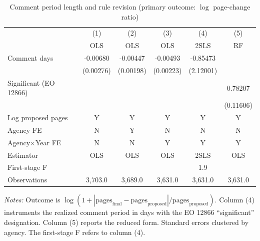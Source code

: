 \begin{table}[t]
\caption{Comment period length and rule revision (primary outcome: $\log$ page-change ratio)}
\label{tab:main}
\centering
\small
\begin{tabular}{lccccc}
\toprule
 & (1) & (2) & (3) & (4) & (5) \\
 & OLS & OLS & OLS & 2SLS & RF \\
\midrule
Comment days & -0.00680 & -0.00447 & -0.00493 & -0.85473 & \\
             & (0.00276) & (0.00198) & (0.00223) & (2.12001) & \\
Significant (EO 12866) & & & & & 0.78207 \\
                        & & & & & (0.11606) \\
\midrule
Log proposed pages & Y & Y & Y & Y & Y \\
Agency FE & N & Y & N & N & N \\
Agency$\times$Year FE & N & N & Y & Y & Y \\
Estimator & OLS & OLS & OLS & 2SLS & OLS \\
First-stage F & & & &  1.9  & \\
Observations & 3,703.0 & 3,689.0 & 3,631.0 & 3,631.0 & 3,631.0 \\
\bottomrule
\end{tabular}
\begin{flushleft}\footnotesize \textit{Notes:} Outcome is $\log(1+|\text{pages}_{\text{final}}-\text{pages}_{\text{proposed}}|/\text{pages}_{\text{proposed}})$. Column (4) instruments the realized comment period in days with the EO 12866 ``significant'' designation. Column (5) reports the reduced form. Standard errors clustered by agency. The first-stage F refers to column (4). \end{flushleft}
\end{table}
